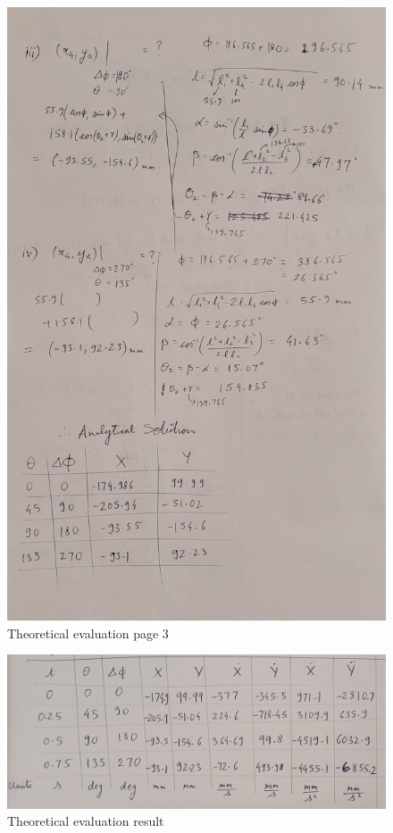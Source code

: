         \begin{figure}[hbt!]
            \centering
            \includegraphics[width=0.9\columnwidth]{Images/Theo_eval3.jpg}
            \caption{Theoretical evaluation page 3}
            \label{fig:theo_eval3}
        \end{figure}

        \begin{figure}[hbt!]
            \centering
            \includegraphics[width=0.9\columnwidth]{Images/theo_eval_result.jpg}
            \caption{Theoretical evaluation result}
            \label{fig:theo_eval_result}
        \end{figure}

